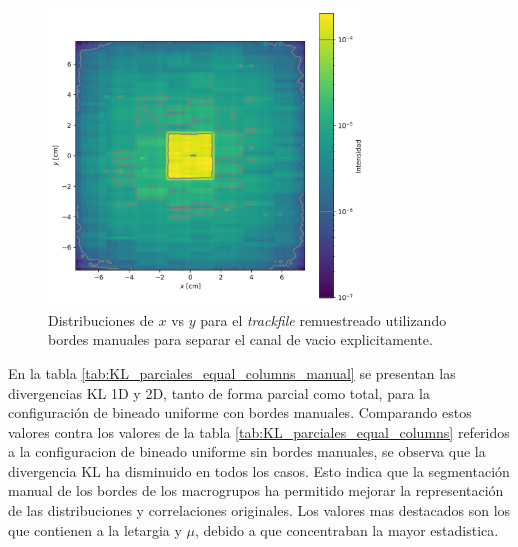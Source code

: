 \begin{figure}[H]
    \centering
    \includegraphics[width=0.75\textwidth]{figs/fig4_9.png}
    \caption{Distribuciones de $x$ vs $y$ para el \emph{trackfile} remuestreado utilizando bordes manuales para separar el canal de vacio explicitamente.}
    \label{fig:trackfile1_x_y_uniforme_manual}
\end{figure}


En la tabla \ref{tab:KL_parciales_equal_columns_manual} se presentan las divergencias KL 1D y 2D, tanto de forma parcial como total, para la configuración de bineado uniforme con bordes manuales. Comparando estos valores contra los valores de la tabla \ref{tab:KL_parciales_equal_columns} referidos a la configuracion de bineado uniforme sin bordes manuales, se observa que la divergencia KL ha disminuido en todos los casos. Esto indica que la segmentación manual de los bordes de los macrogrupos ha permitido mejorar la representación de las distribuciones y correlaciones originales. Los valores mas destacados son los que contienen a la letargia y $\mu$, debido a que concentraban la mayor estadistica.

